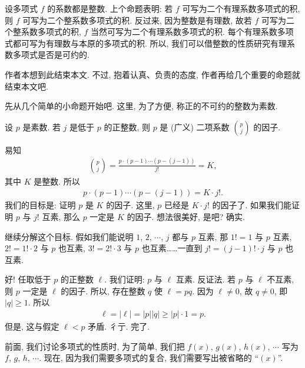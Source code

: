 \begin{remark}
    设多项式 $f$ 的系数都是整数. 上个命题表明: 若 $f$ 可写为二个有理系数多项式的积, 则 $f$ 可写为二个整系数多项式的积. 反过来, 因为整数是有理数, 故若 $f$ 可写为二个整系数多项式的积, $f$ 当然可写为二个有理系数多项式的积. 每个有理系数多项式都可写为有理数与本原的多项式的积. 所以, 我们可以借整数的性质研究有理系数多项式是否是可约的.
\end{remark}

\myLine

作者本想到此结束本文. 不过, 抱着认真、负责的态度, 作者再给几个重要的命题就结束本文吧.

先从几个简单的小命题开始吧. 这里, 为了方便, 称正的不可约的整数为素数.

\begin{proposition}
    设 $p$ 是素数. 若 $j$ 是低于 $p$ 的正整数, 则 $p$ 是 (广义) 二项系数 $\binom{p}{j}$ 的因子.
\end{proposition}

\begin{pf}
    易知
    \begin{align*}
        \binom{p}{j} = \frac{p \cdot (p-1) \cdots (p-(j-1))}{j!} = K,
    \end{align*}
    其中 $K$ 是整数. 所以
    \begin{align*}
        p \cdot (p-1) \cdots (p-(j-1)) = K \cdot j!.
    \end{align*}
    我们的目标是: 证明 $p$ 是 $K$ 的因子. 这里, $p$ 已经是 $K \cdot j!$ 的因子了. 如果我们能证明 $p$ 与 $j!$ 互素, 那么 $p$ 一定是 $K$ 的因子. 想法很美好, 是吧? 确实.

    继续分解这个目标. 假如我们能说明 $1$, $2$, $\cdots$, $j$ 都与 $p$ 互素, 那 $1! = 1$ 与 $p$ 互素, $2! = 1! \cdot 2$ 与 $p$ 也互素, $3! = 2! \cdot 3$ 与 $p$ 也互素……一直到 $j! = (j-1)! \cdot j$ 与 $p$ 也互素.

    好! 任取低于 $p$ 的正整数 $\ell$. 我们证明: $p$ 与 $\ell$ 互素. 反证法. 若 $p$ 与 $\ell$ 不互素, 则 $p$ 一定是 $\ell$ 的因子. 所以, 存在整数 $q$ 使 $\ell = pq$. 因为 $\ell \neq 0$, 故 $q \neq 0$, 即 $|q| \geq 1$. 所以
    \begin{align*}
        \ell = |\ell| = |p| |q| \geq |p| \cdot 1 = p.
    \end{align*}
    但是, 这与假定 $\ell < p$ 矛盾. 彳亍. 完了.
\end{pf}

前面, 我们讨论多项式的性质时, 为了简单, 我们把 $f(x)$, $g(x)$, $h(x)$, $\cdots$ 写为 $f$, $g$, $h$, $\cdots$. 现在, 因为我们需要多项式的复合, 我们需要写出被省略的 ``$(x)$''.

